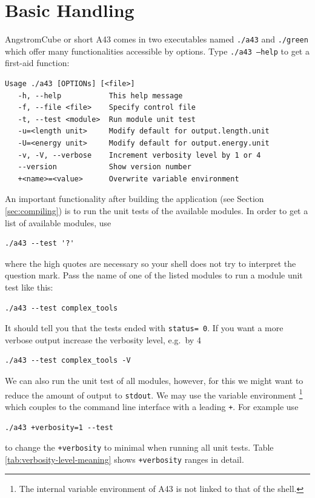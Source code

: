 \documentclass[oribibl]{llncs}
\newcommand{\ttt}[1]{\texttt{#1}}
\newcommand{\fullcodename}{AngstromCube}
\newcommand{\codename}{A43}
\begin{document}
\section{Basic Handling} \label{sec:basic-handling}
%
\fullcodename{} or short \codename{} comes in two executables named \ttt{./a43} and \ttt{./green} which
offer many functionalities accessible by options. Type \ttt{./a43 --help}
to get a first-aid function:
\begin{verbatim}
Usage ./a43 [OPTIONs] [<file>]
   -h, --help          	This help message
   -f, --file <file>   	Specify control file
   -t, --test <module> 	Run module unit test
   -u=<length unit>    	Modify default for output.length.unit
   -U=<energy unit>    	Modify default for output.energy.unit
   -v, -V, --verbose   	Increment verbosity level by 1 or 4
   --version           	Show version number
   +<name>=<value>     	Overwrite variable environment
\end{verbatim}

\noindent
An important functionality after building the application (see Section \ref{sec:compiling})
is to run the unit tests of the available modules.
In order to get a list of available modules, use 
\begin{verbatim}
./a43 --test '?'
\end{verbatim}
where the high quotes are necessary so your shell does not try to interpret the question mark.
Pass the name of one of the listed modules to run a module unit test like this:
\begin{verbatim}
./a43 --test complex_tools
\end{verbatim}
It should tell you that the tests ended with \ttt{status= 0}. 
If you want a more verbose output increase the verbosity level, e.g.~by 4
\begin{verbatim}
./a43 --test complex_tools -V
\end{verbatim}
We can also run the unit test of all modules, however, for this we might want to reduce
the amount of output to \ttt{stdout}.
We may use the variable environment 
\footnote{The internal variable environment of \codename{} is not linked to that of the shell.}
which couples to the command line interface with a leading \ttt{+}.
For example use
\begin{verbatim}
./a43 +verbosity=1 --test
\end{verbatim}
to change the \ttt{+verbosity} to minimal when running all unit tests.
Table \ref{tab:verbosity-level-meaning} shows \ttt{+verbosity} ranges in detail.
\end{document}
